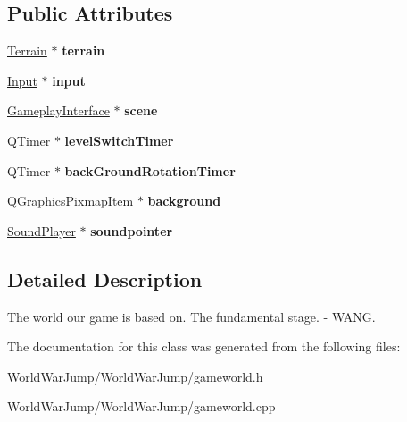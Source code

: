 \subsection*{Public Attributes}
\begin{DoxyCompactItemize}
\item 
\hyperlink{class_terrain}{Terrain} $\ast$ {\bfseries terrain}\hypertarget{class_game_world_a97a0e2bf2693f10e7ab7481ada618191}{}\label{class_game_world_a97a0e2bf2693f10e7ab7481ada618191}

\item 
\hyperlink{class_input}{Input} $\ast$ {\bfseries input}\hypertarget{class_game_world_af51a9a6f7f2f318a7f4842bc7ddddf67}{}\label{class_game_world_af51a9a6f7f2f318a7f4842bc7ddddf67}

\item 
\hyperlink{class_gameplay_interface}{Gameplay\+Interface} $\ast$ {\bfseries scene}\hypertarget{class_game_world_a470317d29e5b698b1e08dc983d78ff50}{}\label{class_game_world_a470317d29e5b698b1e08dc983d78ff50}

\item 
Q\+Timer $\ast$ {\bfseries level\+Switch\+Timer}\hypertarget{class_game_world_a9b1a0f386f286eb864c2a82a0b18e487}{}\label{class_game_world_a9b1a0f386f286eb864c2a82a0b18e487}

\item 
Q\+Timer $\ast$ {\bfseries back\+Ground\+Rotation\+Timer}\hypertarget{class_game_world_a12fff5decf2e34382c409923ec6f4668}{}\label{class_game_world_a12fff5decf2e34382c409923ec6f4668}

\item 
Q\+Graphics\+Pixmap\+Item $\ast$ {\bfseries background}\hypertarget{class_game_world_a42c3f3a06320763c952771c93f49489d}{}\label{class_game_world_a42c3f3a06320763c952771c93f49489d}

\item 
\hyperlink{class_sound_player}{Sound\+Player} $\ast$ {\bfseries soundpointer}\hypertarget{class_game_world_a133678d6bc4754bff909f0e744923549}{}\label{class_game_world_a133678d6bc4754bff909f0e744923549}

\end{DoxyCompactItemize}


\subsection{Detailed Description}
The world our game is based on. The fundamental stage. -\/ W\+A\+NG. 

The documentation for this class was generated from the following files\+:\begin{DoxyCompactItemize}
\item 
World\+War\+Jump/\+World\+War\+Jump/gameworld.\+h\item 
World\+War\+Jump/\+World\+War\+Jump/gameworld.\+cpp\end{DoxyCompactItemize}
